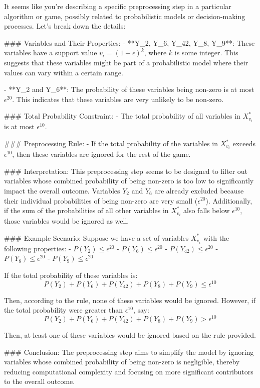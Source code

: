 It seems like you're describing a specific preprocessing step in a particular algorithm or game, possibly related to probabilistic models or decision-making processes. Let's break down the details:

### Variables and Their Properties:
- **Y_2, Y_6, Y_42, Y_8, Y_9**: These variables have a support value \( v_i = (1 + \epsilon)^k \), where \( k \) is some integer. This suggests that these variables might be part of a probabilistic model where their values can vary within a certain range.
  
- **Y_2 and Y_6**: The probability of these variables being non-zero is at most \( \epsilon^{20} \). This indicates that these variables are very unlikely to be non-zero.

### Total Probability Constraint:
- The total probability of all variables in \( X_{v_i}^* \) is at most \( \epsilon^{10} \).

### Preprocessing Rule:
- If the total probability of the variables in \( X_{v_i}^* \) exceeds \( \epsilon^{10} \), then these variables are ignored for the rest of the game.

### Interpretation:
This preprocessing step seems to be designed to filter out variables whose combined probability of being non-zero is too low to significantly impact the overall outcome. Variables \( Y_2 \) and \( Y_6 \) are already excluded because their individual probabilities of being non-zero are very small (\( \epsilon^{20} \)). Additionally, if the sum of the probabilities of all other variables in \( X_{v_i}^* \) also falls below \( \epsilon^{10} \), those variables would be ignored as well.

### Example Scenario:
Suppose we have a set of variables \( X_{v_i}^* \) with the following properties:
- \( P(Y_2) \leq \epsilon^{20} \)
- \( P(Y_6) \leq \epsilon^{20} \)
- \( P(Y_42) \leq \epsilon^{20} \)
- \( P(Y_8) \leq \epsilon^{20} \)
- \( P(Y_9) \leq \epsilon^{20} \)

If the total probability of these variables is:
\[ P(Y_2) + P(Y_6) + P(Y_42) + P(Y_8) + P(Y_9) \leq \epsilon^{10} \]

Then, according to the rule, none of these variables would be ignored. However, if the total probability were greater than \( \epsilon^{10} \), say:
\[ P(Y_2) + P(Y_6) + P(Y_42) + P(Y_8) + P(Y_9) > \epsilon^{10} \]

Then, at least one of these variables would be ignored based on the rule provided.

### Conclusion:
The preprocessing step aims to simplify the model by ignoring variables whose combined probability of being non-zero is negligible, thereby reducing computational complexity and focusing on more significant contributors to the overall outcome.